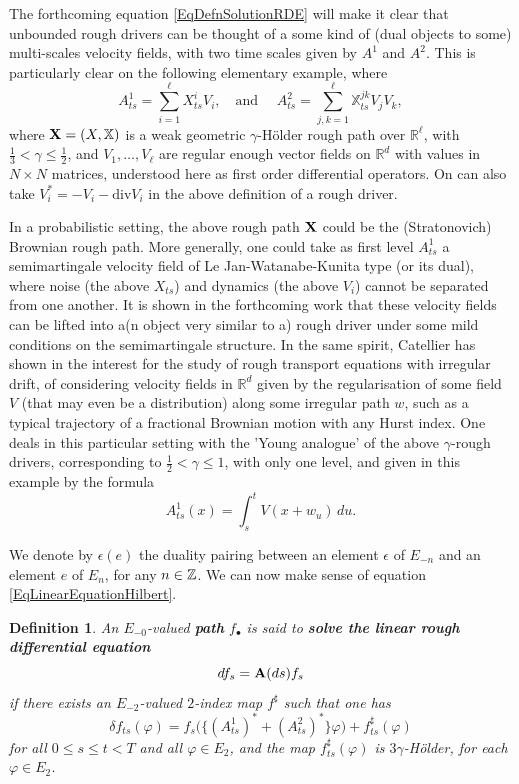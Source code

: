 \documentclass[11pt,a4paper]{amsart}
\newcommand{\RR}{\mathbb{R}}  \newcommand{\CC}{\mathbb{C}}  \newcommand{\LL}{\mathbb{L}}  \newcommand{\WW}{\mathbb{W}}
\newcommand{\bbX}{\mathbb{X}}
\newcommand{\ep}{\epsilon}
\renewcommand{\leq}{\leqslant}
\newcommand{\ssk}{\smallskip}
\newtheorem{defn}[thm]{ \hspace{-0.3cm} {\sc Definition}}%
\numberwithin{equation}{section} %
\begin{document}
\medskip

The forthcoming equation \eqref{EqDefnSolutionRDE} will make it clear that unbounded rough drivers can be thought of a some kind of (dual objects to some) multi-scales velocity fields, with two time scales given by $A^1$ and $A^2$. This is particularly clear on the following elementary example, where
$$
A^1_{ts} = \sum_{i=1}^\ell X^i_{ts}V_i, \quad \textrm{and } \quad A^2_{ts} = \sum_{j,k=1}^\ell \bbX^{jk}_{ts}V_jV_k,
$$
where ${\bfX} = (X,\bbX)$ is a weak geometric $\gamma$-H\"older rough path over $\RR^\ell$, with $\frac{1}{3}<\gamma\leq \frac{1}{2}$, and $V_1,\dots, V_\ell$ are regular enough vector fields on $\RR^d$ with values in $N\times N$ matrices, understood here as first order differential operators. On can also take $V_i^* = -V_i - \textrm{div}V_i$ in the above definition of a rough driver.

\ssk

In a probabilistic setting, the above rough path ${\bf X}$ could be the (Stratonovich) Brownian rough path. More generally, one could take as first level $A^1_{ts}$ a semimartingale velocity field of Le Jan-Watanabe-Kunita type (or its dual), where noise (the above $X_{ts}$) and dynamics (the above $V_i$) cannot be separated from one another. It is shown in the forthcoming work \cite{BailleulRiedel} that these velocity fields can be lifted into a(n object very similar to a) rough driver under some mild conditions on the semimartingale structure. In the same spirit, Catellier has shown in \cite{Catellierregularisation, CatellierTransport} the interest for the study of rough transport equations with irregular drift, of considering velocity fields in $\RR^d$ given by the regularisation of some field $V$ (that may even be a distribution) along some irregular path $w$, such as a typical trajectory of a fractional Brownian motion with any Hurst index. One deals in this particular setting with the 'Young analogue' of the above $\gamma$-rough drivers, corresponding to $\frac{1}{2}<\gamma\leq 1$, with only one level, and given in this example by the formula
$$
A^1_{ts}(x) = \int_s^t V(x+w_u)\,du.
$$

\medskip

We denote by $\ep(e)$ the duality pairing between an element $\ep$ of $E_{-n}$ and an element $e$ of $E_n$, for any $n\in\mathbb{Z}$. We can now make sense of equation \eqref{EqLinearEquationHilbert}. 

\begin{defn}
\label{DefnSolutionEquation}
An $E_{-0}$-valued \emph{\textbf{path}} $f_\bullet$ is said to \emph{\textbf{ solve the linear rough differential equation}}
\begin{equation}
\label{EqRDE}
df_s = {\bf A}(ds)f_s
\end{equation}
if there exists an $E_{-2}$-valued $2$-index map $f^\sharp$ such that one has
\begin{equation}
\label{EqDefnSolutionRDE}
\delta f_{ts}(\varphi) = f_s\Big(\big\{(A^1_{ts})^*+(A^2_{ts})^*\big\}\varphi\Big) + f^\sharp_{ts}(\varphi)
\end{equation}
for all $0\leq s\leq t<T$ and all $\varphi\in E_2$, and the map $f^\sharp_{ts}(\varphi)$ is $3\gamma$-H\"older, for each $\varphi\in E_2$.
\end{defn}
\end{document}
